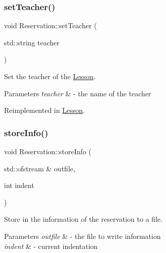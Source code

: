 \mbox{\label{class_reservation_afa8eadd14292a52c6a404078690a7f87}} 
\subsubsection{\texorpdfstring{set\+Teacher()}{setTeacher()}}
{\footnotesize\ttfamily void Reservation\+::set\+Teacher (\begin{DoxyParamCaption}\item[{std\+::string}]{teacher }\end{DoxyParamCaption})\hspace{0.3cm}{\ttfamily [virtual]}}



Set the teacher of the \mbox{\hyperlink{class_lesson}{Lesson}}. 


\begin{DoxyParams}{Parameters}
{\em teacher} & -\/ the name of the teacher \\
\hline
\end{DoxyParams}


Reimplemented in \mbox{\hyperlink{class_lesson_acbfde853aea74c9f2a3a6d50a4812705}{Lesson}}.

\mbox{\label{class_reservation_a8ec83fe2eb15294c3a51a9998ed17df7}} 
\subsubsection{\texorpdfstring{store\+Info()}{storeInfo()}}
{\footnotesize\ttfamily void Reservation\+::store\+Info (\begin{DoxyParamCaption}\item[{std\+::ofstream \&}]{outfile,  }\item[{int}]{indent }\end{DoxyParamCaption})\hspace{0.3cm}{\ttfamily [virtual]}}



Store in the information of the reservation to a file. 


\begin{DoxyParams}{Parameters}
{\em outfile} & -\/ the file to write information \\
\hline
{\em indent} & -\/ current indentation \\
\hline
\end{DoxyParams}


